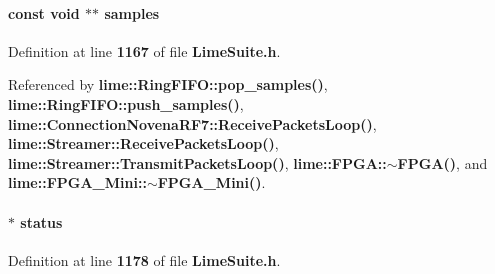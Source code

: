 \paragraph[{samples}]{\setlength{\rightskip}{0pt plus 5cm}const {\bf void} $\ast$$\ast$ samples}\label{group__FN__STREAM_gacb36ed9da2f603c0bc49b783e62e565e}


Definition at line {\bf 1167} of file {\bf Lime\+Suite.\+h}.



Referenced by {\bf lime\+::\+Ring\+F\+I\+F\+O\+::pop\+\_\+samples()}, {\bf lime\+::\+Ring\+F\+I\+F\+O\+::push\+\_\+samples()}, {\bf lime\+::\+Connection\+Novena\+R\+F7\+::\+Receive\+Packets\+Loop()}, {\bf lime\+::\+Streamer\+::\+Receive\+Packets\+Loop()}, {\bf lime\+::\+Streamer\+::\+Transmit\+Packets\+Loop()}, {\bf lime\+::\+F\+P\+G\+A\+::$\sim$\+F\+P\+G\+A()}, and {\bf lime\+::\+F\+P\+G\+A\+\_\+\+Mini\+::$\sim$\+F\+P\+G\+A\+\_\+\+Mini()}.

\paragraph[{status}]{$\ast$ status}\label{group__FN__STREAM_gad9b91ea614f04992bdb30d991963fb6e}


Definition at line {\bf 1178} of file {\bf Lime\+Suite.\+h}.



